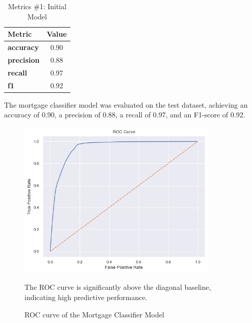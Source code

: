 \begin{table}[h]
    \centering
    \begin{tabular}{l c}
    \toprule
    \textbf{Metric} & \textbf{Value} \\
    \midrule
    \textbf{accuracy} & 0.90 \\
    \textbf{precision} & 0.88 \\
    \textbf{recall} & 0.97 \\
    \textbf{f1} & 0.92 \\
    \bottomrule
    \end{tabular}
    \caption{Metrics \#1: Initial Model}
    \small
    The mortgage classifier model was evaluated on the test dataset, achieving an accuracy of 0.90, a precision of 0.88, a recall of 0.97, and an F1-score of 0.92.
    \label{tab:Model_Evaluation}
\end{table}

\begin{figure}
    \centering
    \includegraphics[width=0.85\textwidth]{images/Model_Training/Initial_ROC_curve.png}
    \caption{ROC curve of the Mortgage Classifier Model}
    \medskip
    \small
    The ROC curve is significantly above the diagonal baseline, indicating high predictive performance.
    \label{fig:Model_Training_ROC}
\end{figure}

